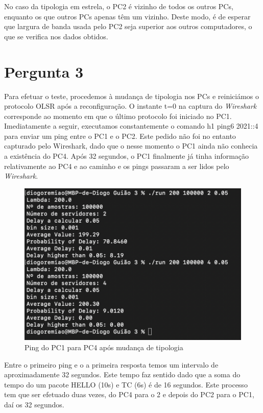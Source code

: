 No caso da tipologia em estrela, o PC2 é vizinho de todos os outros PCs, enquanto os que outros PCs apenas têm um vizinho.
Deste modo, é de esperar que largura de banda usada pelo PC2 seja superior aos outros computadores, o que se verifica nos dados obtidos.


\chapter{Pergunta 3} \label{ex_3}

Para efetuar o teste, procedemos à mudança de tipologia nos PCs e reiniciámos o protocolo OLSR após a reconfiguração.
O instante t=0 na captura do \textit{Wireshark} corresponde ao momento em que o último protocolo foi iniciado no PC1.
Imediatamente a seguir, executamos constantemente o comando h1 ping6 2021::4 para enviar um ping entre o PC1 e o PC2.
Este pedido não foi no entanto capturado pelo Wireshark, dado que o nesse momento o PC1 ainda não conhecia a existência do PC4.
Após 32 segundos, o PC1 finalmente já tinha informação relativamente ao PC4 e ao caminho e os pings passaram a ser lidos pelo \textit{Wireshark}.

\begin{figure}[H]
    \centering
    \includegraphics[width=\linewidth]{figs/image_3.png}
    \caption{Ping do PC1 para PC4 após mudança de tipologia}
    \label{fig:3}
\end{figure}

Entre o primeiro ping e o a primeira resposta temos um intervalo de aproximadamente 32 segundos.
Este tempo faz sentido dado que a soma do tempo do um pacote HELLO (10s) e TC (6s) é de 16 segundos.
Este processo tem que ser efetuado duas vezes, do PC4 para o 2 e depois do PC2 para o PC1, daí os 32 segundos.

